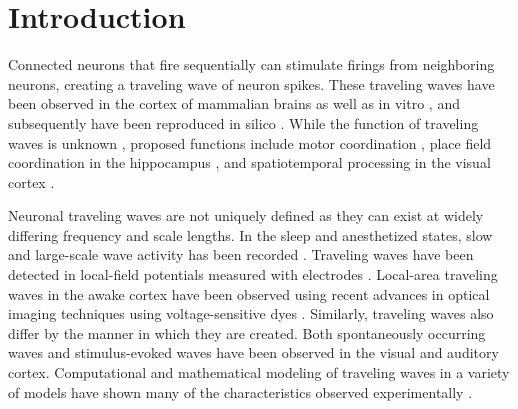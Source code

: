 \documentclass[12pt]{article}
\begin{document}

\section{Introduction} 
Connected neurons that fire sequentially can stimulate firings from neighboring neurons, creating a traveling wave of neuron spikes. 
These traveling waves have been observed in the cortex of mammalian brains \parencite{Muller2018}\parencite{reimer2010}  as well as in vitro \parencite{wu2008}\parencite{huang2004}\parencite{Golomb1999}, and subsequently have been reproduced in silico \parencite{keane2015}\parencite{Senk2020}\parencite{Golomb1996}\parencite{ermentrout2001}. 
While the function of traveling waves is unknown \parencite{wu2008}\parencite{Muller2018}, proposed functions include motor coordination \parencite{Rubino2006}  , place field coordination in the hippocampus \parencite{lubernov2009}, and spatiotemporal processing in the visual cortex \parencite{wu2008}\parencite{Muller2014}.

Neuronal traveling waves are not uniquely defined as they can exist at widely differing frequency and scale lengths.  
In the sleep and anesthetized states, slow and large-scale wave activity has been recorded \parencite{Muller2018}. 
Traveling waves have been detected in local-field potentials measured with electrodes \parencite{Rubino2006}\parencite{sanes1993}\parencite{Riehle2013}.
Local-area traveling waves in the awake cortex have been observed using recent advances in optical imaging techniques using voltage-sensitive dyes \parencite{wu2008}\parencite{Shoham1999}\parencite{Xu2007}\parencite{Ferezou2006}.  
Similarly, traveling waves also differ by the manner in which they are created. 
Both spontaneously occurring waves and stimulus-evoked \parencite{reimer2010} waves have been observed in the visual and auditory cortex. 
Computational and mathematical modeling of traveling waves in a variety of models have shown many of the characteristics observed experimentally \parencite{ermentrout2001}\parencite{keane2015}\parencite{gibson2009}.
\end{document}
